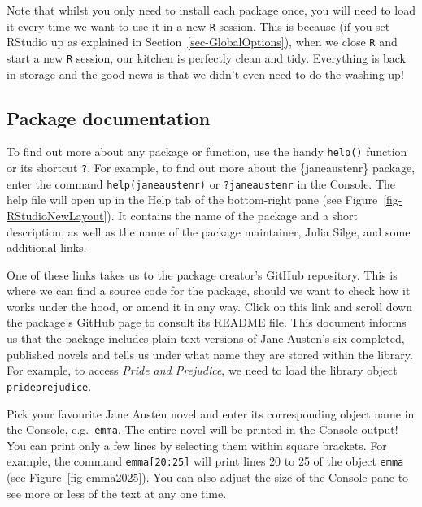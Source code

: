 \documentclass[
  letterpaper,
  DIV=11,
  numbers=noendperiod]{scrreprt}
\begin{document}
Note that whilst you only need to install each package once, you will
need to load it every time we want to use it in a new \texttt{R}
session. This is because (if you set RStudio up as explained in
Section~\ref{sec-GlobalOptions}), when we close \texttt{R} and start a
new \texttt{R} session, our kitchen is perfectly clean and tidy.
Everything is back in storage and the good news is that we didn't even
need to do the washing-up! 

\subsection{Package documentation}\label{sec-PackageDocumentation}

To find out more about any package or function, use the handy
\texttt{help()} function or its shortcut \texttt{?}. For example, to
find out more about the \{janeaustenr\} package, enter the command
\texttt{help(janeaustenr)} or \texttt{?janeaustenr} in the Console. The
help file will open up in the Help tab of the bottom-right pane (see
Figure~\ref{fig-RStudioNewLayout}). It contains the name of the package
and a short description, as well as the name of the package maintainer,
Julia Silge, and some additional links.

One of these links takes us to the package creator's GitHub repository.
This is where we can find a source code for the package, should we want
to check how it works under the hood, or amend it in any way. Click on
this link and scroll down the package's GitHub page to consult its
README file. This document informs us that the package includes plain
text versions of Jane Austen's six completed, published novels and tells
us under what name they are stored within the library. For example, to
access \emph{Pride and Prejudice}, we need to load the library object
\texttt{prideprejudice}.

Pick your favourite Jane Austen novel and enter its corresponding object
name in the Console, e.g.~\texttt{emma}. The entire novel will be
printed in the Console output! You can print only a few lines by
selecting them within square brackets. For example, the command
\texttt{emma{[}20:25{]}} will print lines 20 to 25 of the object
\texttt{emma} (see Figure~\ref{fig-emma2025}). You can also adjust the
size of the Console pane to see more or less of the text at any one
time.
\end{document}
